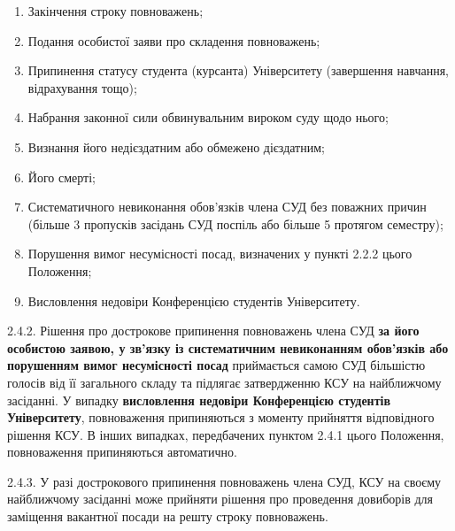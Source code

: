         \begin{enumerate}[label=\alph*)]
            \item Закінчення строку повноважень;
            \item Подання особистої заяви про складення повноважень;
            \item Припинення статусу студента (курсанта) Університету (завершення навчання, відрахування тощо);
            \item Набрання законної сили обвинувальним вироком суду щодо нього;
            \item Визнання його недієздатним або обмежено дієздатним;
            \item Його смерті;
            \item Систематичного невиконання обов'язків члена СУД без поважних причин (більше 3 пропусків засідань СУД поспіль або більше 5 протягом семестру);
            \item Порушення вимог несумісності посад, визначених у пункті 2.2.2 цього Положення;

            \item Висловлення недовіри Конференцією студентів Університету.
        \end{enumerate}

    2.4.2. Рішення про дострокове припинення повноважень члена СУД \textbf{за його особистою заявою, у зв'язку із систематичним невиконанням обов'язків або порушенням вимог несумісності посад} приймається самою СУД більшістю голосів від її загального складу та підлягає затвердженню КСУ на найближчому засіданні. У випадку \textbf{висловлення недовіри Конференцією студентів Університету}, повноваження припиняються з моменту прийняття відповідного рішення КСУ. В інших випадках, передбачених пунктом 2.4.1 цього Положення, повноваження припиняються автоматично.

    2.4.3. У разі дострокового припинення повноважень члена СУД, КСУ на своєму найближчому засіданні може прийняти рішення про проведення довиборів для заміщення вакантної посади на решту строку повноважень. 